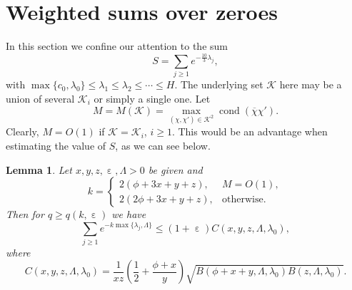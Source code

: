 \documentclass[10pt, reqno]{amsart}
\numberwithin{equation}{section}
\newtheorem{lemma}[theorem]{Lemma}
\newcommand{\bb}[1]{\left(#1\right)}
\renewcommand{\epsilon }{\operatorname{\varepsilon}}
\begin{document}
\section{Weighted sums over zeroes}\label{sec:WeightedSums}

In this section we confine our attention to the sum
\begin{equation}\label{eq:S}
S=\sum_{j\geq 1}e^{-\frac{10}{3}\lambda_j},
\end{equation}
with $\max \{c_0,\lambda_0\}\leq \lambda_1\leq \lambda_2\leq \cdots \leq H$.  The underlying set $\mathcal{K}$ here may be a union of several $\mathcal{K}_i$ or simply a single one. Let
\begin{equation}\label{eq:M}
M=M(\mathcal{K})=\max_{(\chi,\chi')\in \mathcal{K}^2}\operatorname{cond}(\overline{\chi} \chi').
\end{equation}
Clearly, $M=O(1)$ if $\mathcal{K}=\mathcal{K}_i$, $i\geq 1$. This would be an advantage when estimating the value of $S$, as we can see below.

\begin{lemma}\label{lem:Density1}
Let $x,y,z,\epsilon,\Lambda>0$ be given and
\begin{equation}\label{eq:k}
k=\begin{cases}
2(\phi+3x+y+z), &M=O(1),\\
2(2\phi+3x+y+z), &\text{otherwise}.
\end{cases}
\end{equation}
Then for $q\geq q(k,\epsilon)$ we have
\begin{equation}\label{eq:Density1Result}
\sum_{j\geq 1} e^{-k\max\{\lambda_{j},\Lambda\}}\leq (1+\epsilon) C(x,y,z,\Lambda,\lambda_0),
\end{equation}
where
\begin{equation}\label{eq:C}
C(x,y,z,\Lambda,\lambda_0)=\frac{1}{xz}\bb{\frac{1}{2}+\frac{\phi+x}{y}}\sqrt{B\bb{\phi+x+y,\Lambda,\lambda_0}B(z,\Lambda,\lambda_0)}.
\end{equation}
\end{lemma}
\end{document}
